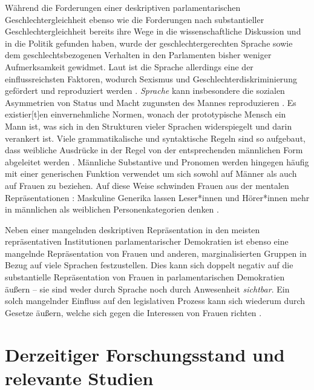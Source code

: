 \documentclass[12pt, 
    twoside=false, 
    bibliography=totoc, 
    numbers=endperiod, 
    headings=normal, 
    toc=chapterentrydotfill
    ]{scrbook}
\begin{document}
Während die Forderungen einer deskriptiven parlamentarischen Geschlechtergleichheit ebenso wie die Forderungen nach substantieller Geschlechtergleichheit bereits ihre Wege in die wissenschaftliche Diskussion und in die Politik gefunden haben, wurde der geschlechtergerechten Sprache sowie dem geschlechtsbezogenen Verhalten in den Parlamenten bisher weniger Aufmerksamkeit gewidmet. 
Laut \textcite{menegatti_2017} ist die Sprache allerdings eine der einflussreichsten Faktoren, wodurch Sexismus und Geschlechterdiskriminierung gefördert und reproduziert werden \parencite*[1]{menegatti_2017}. \emph{Sprache} kann insbesondere die sozialen Asymmetrien von Status und Macht zugunsten des Mannes reproduzieren \parencite[1]{menegatti_2017}. Es existier[t]en einvernehmliche Normen, wonach der prototypische Mensch ein Mann ist, was sich in den Strukturen vieler Sprachen widerspiegelt und darin verankert ist. Viele grammatikalische und syntaktische Regeln sind so aufgebaut, dass weibliche Ausdrücke in der Regel von der entsprechenden männlichen Form abgeleitet werden \parencite*[1]{menegatti_2017}. Männliche Substantive und Pronomen werden hingegen häufig mit einer generischen Funktion verwendet um sich sowohl auf Männer als auch auf Frauen zu beziehen. Auf diese Weise schwinden Frauen aus der mentalen Repräsentationen \parencites{vaughan_2018}{stahlberg_2001}: Maskuline Generika lassen Leser*innen und Hörer*innen mehr in männlichen als weiblichen Personenkategorien denken \parencites[2]{sczesny_2016}{stahlberg_2007}.

Neben einer mangelnden deskriptiven Repräsentation in den meisten repräsentativen Institutionen parlamentarischer Demokratien \parencite[vgl.][]{ipu_2019} ist ebenso eine mangelnde Repräsentation von Frauen und anderen, marginalisierten Gruppen in Bezug auf viele Sprachen festzustellen. Dies kann sich doppelt negativ auf die substantielle Repräsentation von Frauen in parlamentarischen Demokratien äußern -- sie sind weder durch Sprache noch durch Anwesenheit \emph{sichtbar}. Ein solch mangelnder Einfluss auf den legislativen Prozess kann sich wiederum durch Gesetze äußern, welche sich gegen die Interessen von Frauen richten \parencite[2]{back_2018}. 


\section {Derzeitiger Forschungsstand und relevante Studien}
\end{document}
